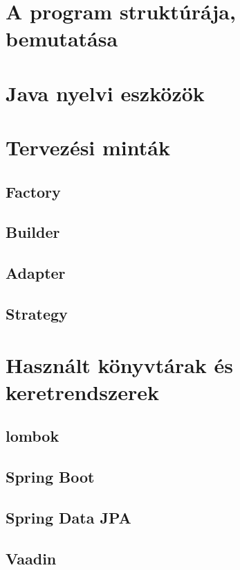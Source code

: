 \section{A program struktúrája, bemutatása}

\section{Java nyelvi eszközök}

\section{Tervezési minták}

\subsection{Factory}

\subsection{Builder}

\subsection{Adapter}

\subsection{Strategy}

\section{Használt könyvtárak és keretrendszerek}

\subsection{lombok}



\subsection{Spring Boot}

\subsection{Spring Data JPA}

\subsection{Vaadin}

